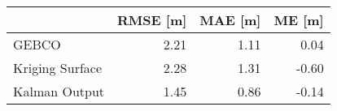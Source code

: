 
\begin{tabular}{lrrr}
\toprule
 & RMSE [m] & MAE [m] & ME [m] \\
\midrule
GEBCO & 2.21 & 1.11 & 0.04 \\
Kriging Surface & 2.28 & 1.31 & -0.60 \\
Kalman Output & 1.45 & 0.86 & -0.14 \\
\bottomrule
\end{tabular}

